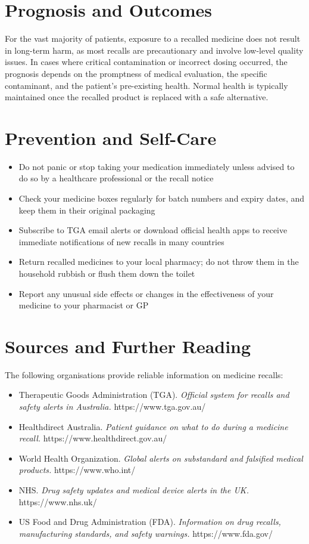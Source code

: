 \section*{Prognosis and Outcomes}
For the vast majority of patients, exposure to a recalled medicine does not result in long-term harm, as most recalls are precautionary and involve low-level quality issues. In cases where critical contamination or incorrect dosing occurred, the prognosis depends on the promptness of medical evaluation, the specific contaminant, and the patient's pre-existing health. Normal health is typically maintained once the recalled product is replaced with a safe alternative.

\section*{Prevention and Self-Care}
\begin{itemize}
    \item Do not panic or stop taking your medication immediately unless advised to do so by a healthcare professional or the recall notice
    \item Check your medicine boxes regularly for batch numbers and expiry dates, and keep them in their original packaging
    \item Subscribe to TGA email alerts or download official health apps to receive immediate notifications of new recalls in many countries
    \item Return recalled medicines to your local pharmacy; do not throw them in the household rubbish or flush them down the toilet
    \item Report any unusual side effects or changes in the effectiveness of your medicine to your pharmacist or GP
\end{itemize}

\section*{Sources and Further Reading}
The following organisations provide reliable information on medicine recalls:

\begin{itemize}
    \item Therapeutic Goods Administration (TGA). \textit{Official system for recalls and safety alerts in Australia.} https://www.tga.gov.au/
    \item Healthdirect Australia. \textit{Patient guidance on what to do during a medicine recall.} https://www.healthdirect.gov.au/
    \item World Health Organization. \textit{Global alerts on substandard and falsified medical products.} https://www.who.int/
    \item NHS. \textit{Drug safety updates and medical device alerts in the UK.} https://www.nhs.uk/
    \item US Food and Drug Administration (FDA). \textit{Information on drug recalls, manufacturing standards, and safety warnings.} https://www.fda.gov/
\end{itemize}
